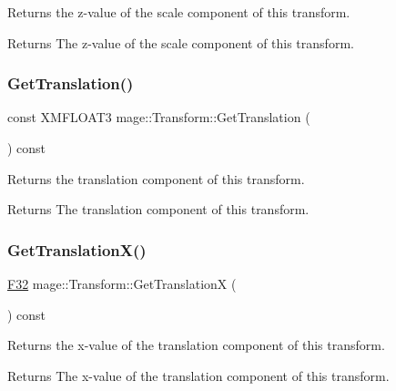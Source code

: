 Returns the z-\/value of the scale component of this transform.

\begin{DoxyReturn}{Returns}
The z-\/value of the scale component of this transform. 
\end{DoxyReturn}
\hypertarget{structmage_1_1_transform_af034983b5df429b31a3229270cc0b00b}{}\label{structmage_1_1_transform_af034983b5df429b31a3229270cc0b00b} 
\subsubsection{\texorpdfstring{Get\+Translation()}{GetTranslation()}}
{\footnotesize\ttfamily const X\+M\+F\+L\+O\+A\+T3 mage\+::\+Transform\+::\+Get\+Translation (\begin{DoxyParamCaption}{ }\end{DoxyParamCaption}) const\hspace{0.3cm}{\ttfamily [noexcept]}}

Returns the translation component of this transform.

\begin{DoxyReturn}{Returns}
The translation component of this transform. 
\end{DoxyReturn}
\hypertarget{structmage_1_1_transform_a90b2c059a45964bf4de816a4b7e6c55c}{}\label{structmage_1_1_transform_a90b2c059a45964bf4de816a4b7e6c55c} 
\subsubsection{\texorpdfstring{Get\+Translation\+X()}{GetTranslationX()}}
{\footnotesize\ttfamily \hyperlink{namespacemage_aa97e833b45f06d60a0a9c4fc22ae02c0}{F32} mage\+::\+Transform\+::\+Get\+TranslationX (\begin{DoxyParamCaption}{ }\end{DoxyParamCaption}) const\hspace{0.3cm}{\ttfamily [noexcept]}}

Returns the x-\/value of the translation component of this transform.

\begin{DoxyReturn}{Returns}
The x-\/value of the translation component of this transform. 
\end{DoxyReturn}
\hypertarget{structmage_1_1_transform_a3a806edeeca4db92bdfa4d401ba17cb4}{}\label{structmage_1_1_transform_a3a806edeeca4db92bdfa4d401ba17cb4} 
